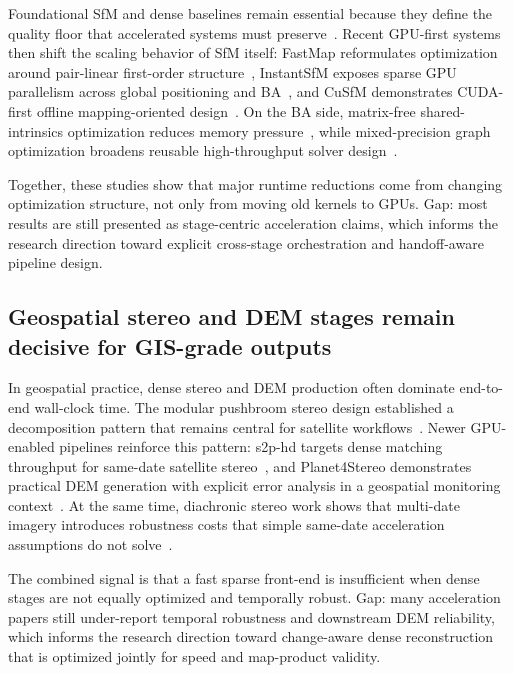 Foundational SfM and dense baselines remain essential because they define the quality floor that accelerated systems must preserve~\cite{Schonberger2016,Schonberger2016MVS,Galliani2015}. Recent GPU-first systems then shift the scaling behavior of SfM itself: FastMap reformulates optimization around pair-linear first-order structure~\cite{Li2025FastMap}, InstantSfM exposes sparse GPU parallelism across global positioning and BA~\cite{Zhong2025InstantSfM}, and CuSfM demonstrates CUDA-first offline mapping-oriented design~\cite{Yu2025CuSfM}. On the BA side, matrix-free shared-intrinsics optimization reduces memory pressure~\cite{Safari2025}, while mixed-precision graph optimization broadens reusable high-throughput solver design~\cite{Gopinath2025}.

Together, these studies show that major runtime reductions come from changing optimization structure, not only from moving old kernels to GPUs. Gap: most results are still presented as stage-centric acceleration claims, which informs the research direction toward explicit cross-stage orchestration and handoff-aware pipeline design.

\subsection{Geospatial stereo and DEM stages remain decisive for GIS-grade outputs}

In geospatial practice, dense stereo and DEM production often dominate end-to-end wall-clock time. The modular pushbroom stereo design established a decomposition pattern that remains central for satellite workflows~\cite{deFranchis2014}. Newer GPU-enabled pipelines reinforce this pattern: s2p-hd targets dense matching throughput for same-date satellite stereo~\cite{Amadei2025}, and Planet4Stereo demonstrates practical DEM generation with explicit error analysis in a geospatial monitoring context~\cite{Elias2025}. At the same time, diachronic stereo work shows that multi-date imagery introduces robustness costs that simple same-date acceleration assumptions do not solve~\cite{Masquil2026}.

The combined signal is that a fast sparse front-end is insufficient when dense stages are not equally optimized and temporally robust. Gap: many acceleration papers still under-report temporal robustness and downstream DEM reliability, which informs the research direction toward change-aware dense reconstruction that is optimized jointly for speed and map-product validity.

